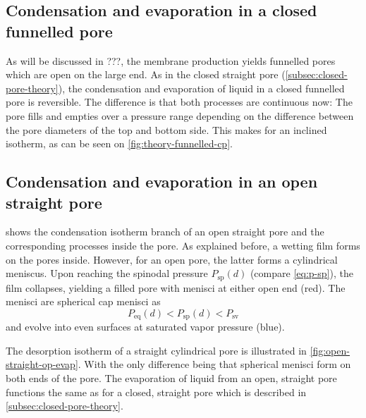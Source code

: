 \documentclass[../thesis.tex]{subfiles}
\begin{document}
      \subsection{Condensation and evaporation in a closed funnelled pore}
      \label{subsec:closed-funnelled-pore-theory}

        As will be discussed in ???, the membrane production yields funnelled pores which are open on the large end. As in the closed straight pore (\cref{subsec:closed-pore-theory}), the condensation and evaporation of liquid in a closed funnelled pore is reversible. The difference is that both processes are continuous now: The pore fills and empties over a pressure range depending on the difference between the pore diameters of the top and bottom side. This makes for an inclined isotherm, as can be seen on \cref{fig:theory-funnelled-cp}.

              
              
              

      \subsection{Condensation and evaporation in an open straight pore}
      \label{subsec:open-pore-theory}

         shows the condensation isotherm branch of an open straight pore and the corresponding processes inside the pore. As explained before, a wetting film forms on the pores inside. However, for an open pore, the latter forms a cylindrical meniscus. Upon reaching the spinodal pressure $P_\mathrm{sp}(d)$ (compare \cref{eq:p-sp}), the film collapses, yielding a filled pore with menisci at either open end (red). The menisci are spherical cap menisci as
        \begin{equation}
          P_\mathrm{eq}(d)<P_\mathrm{sp}(d)<P_\mathrm{sv}
        \end{equation}
        and evolve into even surfaces at saturated vapor pressure (blue).
        \medskip

        The desorption isotherm of a straight cylindrical pore is illustrated in \cref{fig:open-straight-op-evap}. With the only difference being that spherical menisci form on both ends of the pore. The evaporation of liquid from an open, straight pore functions the same as for a closed, straight pore which is described in \cref{subsec:closed-pore-theory}.
\end{document}
